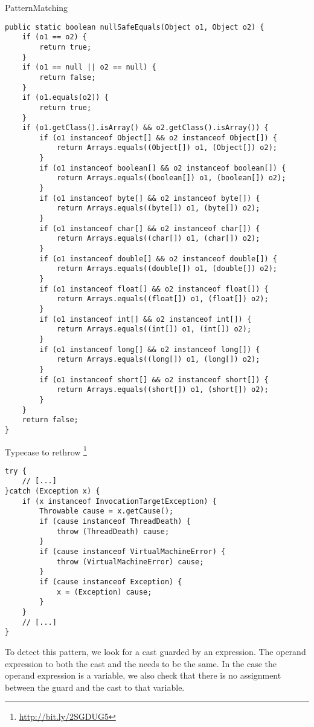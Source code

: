 \begin{pattern}{PatternMatching}
\begin{verbatim}
public static boolean nullSafeEquals(Object o1, Object o2) {
	if (o1 == o2) {
		return true;
	}
	if (o1 == null || o2 == null) {
		return false;
	}
	if (o1.equals(o2)) {
		return true;
	}
	if (o1.getClass().isArray() && o2.getClass().isArray()) {
		if (o1 instanceof Object[] && o2 instanceof Object[]) {
			return Arrays.equals((Object[]) o1, (Object[]) o2);
		}
		if (o1 instanceof boolean[] && o2 instanceof boolean[]) {
			return Arrays.equals((boolean[]) o1, (boolean[]) o2);
		}
		if (o1 instanceof byte[] && o2 instanceof byte[]) {
			return Arrays.equals((byte[]) o1, (byte[]) o2);
		}
		if (o1 instanceof char[] && o2 instanceof char[]) {
			return Arrays.equals((char[]) o1, (char[]) o2);
		}
		if (o1 instanceof double[] && o2 instanceof double[]) {
			return Arrays.equals((double[]) o1, (double[]) o2);
		}
		if (o1 instanceof float[] && o2 instanceof float[]) {
			return Arrays.equals((float[]) o1, (float[]) o2);
		}
		if (o1 instanceof int[] && o2 instanceof int[]) {
			return Arrays.equals((int[]) o1, (int[]) o2);
		}
		if (o1 instanceof long[] && o2 instanceof long[]) {
			return Arrays.equals((long[]) o1, (long[]) o2);
		}
		if (o1 instanceof short[] && o2 instanceof short[]) {
			return Arrays.equals((short[]) o1, (short[]) o2);
		}
	}
	return false;
}
\end{verbatim}

Typecase to rethrow
\footnote{\url{http://bit.ly/2SGDUG5}}

\begin{verbatim}
try {
	// [...]
}catch (Exception x) {
	if (x instanceof InvocationTargetException) {
		Throwable cause = x.getCause();
		if (cause instanceof ThreadDeath) {
			throw (ThreadDeath) cause;
		}
		if (cause instanceof VirtualMachineError) {
			throw (VirtualMachineError) cause;
		}
		if (cause instanceof Exception) {
			x = (Exception) cause;
		}
	}
	// [...]
}
\end{verbatim}

\detection{}
To detect this pattern, we look for a cast guarded by an  expression.
The operand expression to both the cast and the  needs to be the same.
In the case the operand expression is a variable, we also check that there is no assignment between the  guard and the cast to that variable.


\end{pattern}
